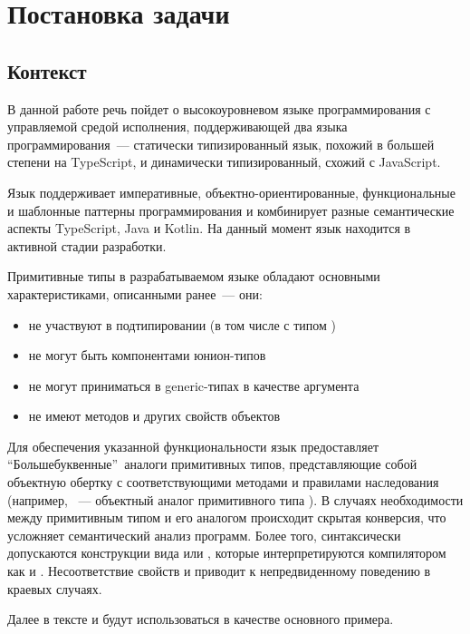 \newpage
\section{Постановка задачи}
\label{sec:Chapter1} 

\subsection{Контекст}
В данной работе речь пойдет о высокоуровневом языке программирования с управляемой средой исполнения, поддерживающей два языка программирования~--- статически типизированный язык, похожий в большей степени на TypeScript, и динамически типизированный, схожий с JavaScript.

Язык поддерживает императивные, объектно-ориентированные, функциональные и шаблонные паттерны программирования и комбинирует разные семантические аспекты TypeScript, Java и Kotlin. На данный момент язык находится в активной стадии разработки.

Примитивные типы в разрабатываемом языке обладают основными характеристиками, описанными ранее~--- они:
\begin{itemize}
    \item не участвуют в подтипировании (в том числе с типом )
    \item не могут быть компонентами юнион-типов
    \item не могут приниматься в generic-типах в качестве аргумента
    \item не имеют методов и других свойств объектов
\end{itemize}

Для обеспечения указанной функциональности язык предоставляет \textquotedblleft Большебуквенные\textquotedblright\ аналоги примитивных типов, представляющие собой объектную обертку с соответствующими методами и правилами наследования (например, ~--- объектный аналог примитивного типа ).
В случаях необходимости между примитивным типом и его аналогом происходит скрытая конверсия, что усложняет семантический анализ программ. Более того, синтаксически допускаются конструкции вида  или , которые интерпретируются компилятором как  и . Несоответствие свойств  и  приводит к непредвиденному поведению в краевых случаях.

Далее в тексте  и  будут использоваться в качестве основного примера.

